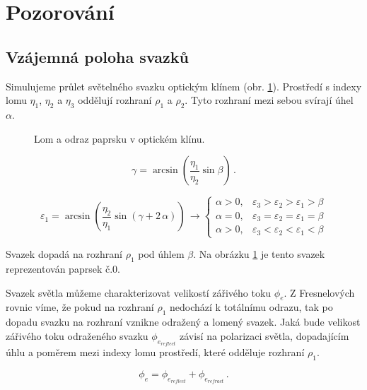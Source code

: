 \section{Pozorování}

\subsection{Vzájemná poloha svazků}

Simulujeme průlet světelného svazku optickým klínem (obr. \ref{fig:wedge}). Prostředí s indexy lomu $\eta_1$, $\eta_2$ a $\eta_3$ oddělují rozhraní $\rho_1$ a $\rho_2$. Tyto rozhraní mezi sebou svírají úhel $\alpha$.
\begin{figure}[h!]
\begin{center}
\scalebox{0.8}{ }
\end{center}
\caption{Lom a odraz paprsku v optickém klínu.}
\label{fig:wedge}
\end{figure}

\begin{equation}
\gamma = \arcsin{\left(\frac{\eta_1}{\eta_2}\sin{\beta}\right)}\,.
\end{equation}

\begin{equation}
\varepsilon_1 = \arcsin{\left(\frac{\eta_2}{\eta_1}\sin{\left(\gamma + 2\,\alpha\right)}\right)}\, 
\rightarrow \begin{cases}
\alpha > 0, & \varepsilon_3 > \varepsilon_2 > \varepsilon_1 > \beta\\
\alpha = 0, & \varepsilon_3 = \varepsilon_2 = \varepsilon_1 = \beta\\
\alpha > 0, & \varepsilon_3 < \varepsilon_2 < \varepsilon_1 < \beta
\end{cases}
\end{equation}


Svazek dopadá na rozhraní $\rho_1$ pod úhlem $\beta$. Na obrázku \ref{fig:wedge} je tento svazek reprezentován paprsek č.0. 

Svazek světla můžeme charakterizovat velikostí zářivého toku $\phi_e$. Z Fresnelových rovnic víme, že pokud na rozhraní $\rho_1$ nedochází k totálnímu odrazu, tak po dopadu svazku na rozhraní vznikne odražený a lomený svazek. Jaká bude velikost zářivého toku odraženého svazku $\phi_{e_{reflect}}$ závisí na polarizaci světla, dopadajícím úhlu a poměrem mezi indexy lomu prostředí, které odděluje rozhraní $\rho_1$.

\begin{equation}
\phi_e = \phi_{e_{reflect}} + \phi_{e_{refract}}\,.
\end{equation}

